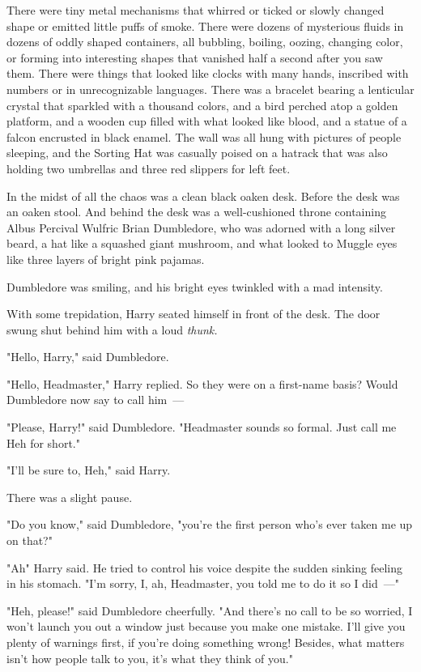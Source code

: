 There were tiny metal mechanisms that whirred or ticked or slowly changed shape
or emitted little puffs of smoke. There were dozens of mysterious fluids in
dozens of oddly shaped containers, all bubbling, boiling, oozing, changing
color, or forming into interesting shapes that vanished half a second after you
saw them. There were things that looked like clocks with many hands, inscribed
with numbers or in unrecognizable languages. There was a bracelet bearing a
lenticular crystal that sparkled with a thousand colors, and a bird perched
atop a golden platform, and a wooden cup filled with what looked like blood,
and a statue of a falcon encrusted in black enamel. The wall was all hung with
pictures of people sleeping, and the Sorting Hat was casually poised on a
hatrack that was also holding two umbrellas and three red slippers for left
feet.

In the midst of all the chaos was a clean black oaken desk. Before the desk was
an oaken stool. And behind the desk was a well-cushioned throne containing
Albus Percival Wulfric Brian Dumbledore, who was adorned with a long silver
beard, a hat like a squashed giant mushroom, and what looked to Muggle eyes
like three layers of bright pink pajamas.

Dumbledore was smiling, and his bright eyes twinkled with a mad intensity.

With some trepidation, Harry seated himself in front of the desk. The door
swung shut behind him with a loud \emph{thunk.}

"Hello, Harry," said Dumbledore.

"Hello, Headmaster," Harry replied. So they were on a first-name basis? Would
Dumbledore now say to call him~---

"Please, Harry!" said Dumbledore. "Headmaster sounds so formal. Just call me
Heh for short."

"I'll be sure to, Heh," said Harry.

There was a slight pause.

"Do you know," said Dumbledore, "you're the first person who's ever taken me up
on that?"

"Ah{\el}" Harry said. He tried to control his voice despite the sudden
sinking feeling in his stomach. "I'm sorry, I, ah, Headmaster, you told me to
do it so I did~---"

"Heh, please!" said Dumbledore cheerfully. "And there's no call to be so
worried, I won't launch you out a window just because you make one mistake.
I'll give you plenty of warnings first, if you're doing something wrong!
Besides, what matters isn't how people talk to you, it's what they think of
you."

